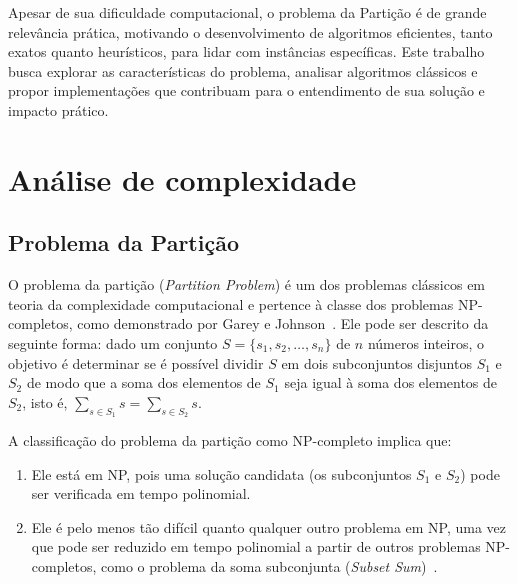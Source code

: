 \documentclass{article}
\begin{document}
Apesar de sua dificuldade computacional, o problema da Partição é de grande relevância prática, motivando o desenvolvimento de algoritmos eficientes, tanto exatos quanto heurísticos, para lidar com instâncias específicas. Este trabalho busca explorar as características do problema, analisar algoritmos clássicos e propor implementações que contribuam para o entendimento de sua solução e impacto prático.

\section{Análise de complexidade}

\subsection{Problema da Partição}

O problema da partição (\textit{Partition Problem}) é um dos problemas clássicos em teoria da complexidade computacional e pertence à classe dos problemas NP-completos, como demonstrado por Garey e Johnson~\cite{garey1979computers}. Ele pode ser descrito da seguinte forma: dado um conjunto $S = \{s_1, s_2, \dots, s_n\}$ de $n$ números inteiros, o objetivo é determinar se é possível dividir $S$ em dois subconjuntos disjuntos $S_1$ e $S_2$ de modo que a soma dos elementos de $S_1$ seja igual à soma dos elementos de $S_2$, isto é, $\sum_{s \in S_1}s = \sum_{s \in S_2}s$.

A classificação do problema da partição como NP-completo implica que:
\begin{enumerate}
    \item Ele está em NP, pois uma solução candidata (os subconjuntos $S_1$ e $S_2$) pode ser verificada em tempo polinomial.
    \item Ele é pelo menos tão difícil quanto qualquer outro problema em NP, uma vez que pode ser reduzido em tempo polinomial a partir de outros problemas NP-completos, como o problema da soma subconjunta (\textit{Subset Sum})~\cite{karp1972reducibility}.
\end{enumerate}
\end{document}
